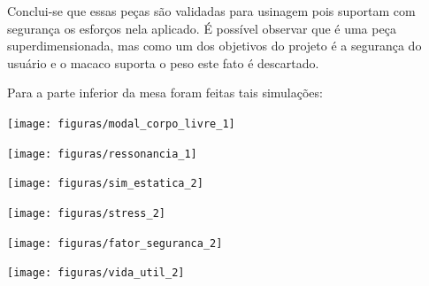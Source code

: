     Conclui-se que essas peças são validadas para usinagem pois suportam com segurança os esforços nela aplicado. É possível observar que é uma peça superdimensionada, mas como um dos objetivos do projeto é a segurança do usuário e o macaco suporta o peso este fato é descartado.

    Para a parte inferior da mesa foram feitas tais simulações:

    \begin{center}
    	\texttt{[image: figuras/modal\_corpo\_livre\_1]}
        \label{modal_corpo_livre_1}
    \end{center}

    \begin{center}
    	\texttt{[image: figuras/ressonancia\_1]}
        \label{ressonancia_1}
    \end{center}

    \begin{center}
    	\texttt{[image: figuras/sim\_estatica\_2]}
        \label{sim_estatica_2}
    \end{center}

    \begin{center}
    	\texttt{[image: figuras/stress\_2]}
        \label{stress_2}
    \end{center}

    \begin{center}
    	\texttt{[image: figuras/fator\_seguranca\_2]}
        \label{fator_seguranca_2}
    \end{center}

    \begin{center}
    	\texttt{[image: figuras/vida\_util\_2]}
        \label{vida_util_2}
    \end{center}


